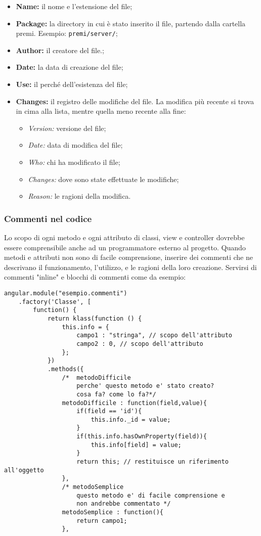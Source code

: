 \begin{itemize}
\item \textbf{Name:} il nome e l'estensione del file;
\item \textbf{Package:} la directory in cui è stato inserito il file, partendo dalla cartella premi. Esempio: \texttt{premi/server/};
\item \textbf{Author:} il creatore del file.;
\item \textbf{Date:} la data di creazione del file;
\item \textbf{Use:} il perché dell'esistenza del file;
\item \textbf{Changes:} il registro delle modifiche del file. La modifica più recente si trova in cima alla lista, mentre quella meno recente alla fine:
	\begin{itemize}
		\item \textit{Version:} versione del file;
		\item \textit{Date:} data di modifica del file;
		\item \textit{Who:} chi ha modificato il file;
		\item \textit{Changes:} dove sono state effettuate le modifiche;
		\item \textit{Reason:} le ragioni della modifica.
	\end{itemize}
\end{itemize}

\subsubsection{Commenti nel codice}
Lo scopo di ogni metodo e ogni attributo di classi, view e controller dovrebbe essere comprensibile anche ad un programmatore esterno al progetto.
Quando metodi e attributi non sono di facile comprensione, inserire dei commenti che ne descrivano il funzionamento, l'utilizzo, e le ragioni della loro creazione. Servirsi di commenti "inline" e blocchi di commenti come da esempio:

\color{blue}\begin{lstlisting}[frame=single]
angular.module("esempio.commenti")
	.factory('Classe', [
		function() {
            return klass(function () {
                this.info = {
                    campo1 : "stringa", // scopo dell'attributo
                    campo2 : 0, // scopo dell'attributo
                };
            })        
            .methods({
                /*  metodoDifficile
                    perche' questo metodo e' stato creato?
                    cosa fa? come lo fa?*/
                metodoDifficile : function(field,value){
                    if(field == 'id'){
                        this.info._id = value;
                    }
                    if(this.info.hasOwnProperty(field)){
                        this.info[field] = value;
                    }
                    return this; // restituisce un riferimento all'oggetto
                },
                /* metodoSemplice
                    questo metodo e' di facile comprensione e 
                    non andrebbe commentato */
                metodoSemplice : function(){
                    return campo1;
                },
\end{lstlisting}\color{black}

